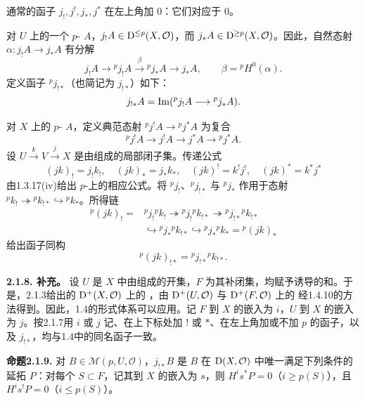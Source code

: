 通常的函子 $j_!,j^!,j_*,j^*$ 在左上角加 $0$：它们对应于 $0$。

对 $U$ 上的一个 $p$- $A$，$j_!A\in\mathrm{D}^{\leq p}(X,\mathcal O)$，而 $j_*A\in\mathrm{D}^{\geq p}(X,\mathcal O)$。因此，自然态射 $\alpha\colon j_!A\to j_*A$ 有分解
\[
 j_!A\longrightarrow{}^pj_!A\xrightarrow{\beta}{}^pj_*A
 \longrightarrow j_*A,\qquad\beta={}^pH^0(\alpha).
\]
定义函子 ${}^pj_{!*}$（也简记为 $j_{!*}$）如下：
\[
 j_{!*}A=\operatorname{Im}({}^pj_!A\longrightarrow{}^pj_*A).
\]

对 $X$ 上的 $p$- $A$，定义典范态射 ${}^pj^!A\to{}^pj^*A$ 为复合
\[
 {}^pj^!A\longrightarrow j^!A\longrightarrow j^*A\longrightarrow{}^pj^*A.
\]
设 $U\xrightarrow{k}V\xrightarrow{j}X$ 是由组成的局部闭子集。传递公式
\[
 (jk)_!=j_!k_!,\quad(jk)_*=j_*k_*,\quad
 (jk)^!=k^!j^!,\quad(jk)^*=k^*j^*
\]
由1.3.17(iv)给出 $p$-上的相应公式。将 ${}^pj_!$、${}^pj_{!*}$ 与 ${}^pj_*$ 作用于态射 ${}^pk_!\twoheadrightarrow{}^pk_{!*}\hookrightarrow{}^pk_*$。所得链
\[
\begin{aligned}
{}^p(jk)_!={}&{}^pj_!{}^pk_!
 \twoheadrightarrow{}^pj_!{}^pk_{!*}
 \twoheadrightarrow{}^pj_{!*}{}^pk_{!*}\\
 &\hookrightarrow{}^pj_*{}^pk_{!*}
 \hookrightarrow{}^pj_*{}^pk_*={}^p(jk)_*
\end{aligned}
\]
给出函子同构
\begin{equation*}
 {}^p(jk)_{!*}={}^pj_{!*}{}^pk_{!*}.\tag{2.1.7.1}
\end{equation*}

\par\medskip\noindent\textbf{2.1.8. 补充。} 设 $U$ 是 $X$ 中由组成的开集，$F$ 为其补闭集，均赋予诱导的和。于是，2.1.3给出的 $\mathrm{D}^+(X,\mathcal O)$ 上的 ，由 $\mathrm{D}^+(U,\mathcal O)$ 与 $\mathrm{D}^+(F,\mathcal O)$ 上的 经1.4.10的方法得到。因此，1.4的形式体系可以应用。记 $F$ 到 $X$ 的嵌入为 $i$，$U$ 到 $X$ 的嵌入为 $j$。按2.1.7用 $i$ 或 $j$ 记、在上下标处加 $!$ 或 $*$、在左上角加或不加 $p$ 的函子，以及 $j_{!*}$，均与1.4中的同名函子一致。

\par\medskip\noindent\textbf{命题2.1.9.} 对 $B\in\mathcal M(p,U,\mathcal O)$，$j_{!*}B$ 是 $B$ 在 $\mathrm{D}(X,\mathcal O)$ 中唯一满足下列条件的延拓 $P$：对每个 $S\subset F$，记其到 $X$ 的嵌入为 $s$，则 $H^is^*P=0$（$i\geq p(S)$），且 $H^is^!P=0$（$i\leq p(S)$）。

